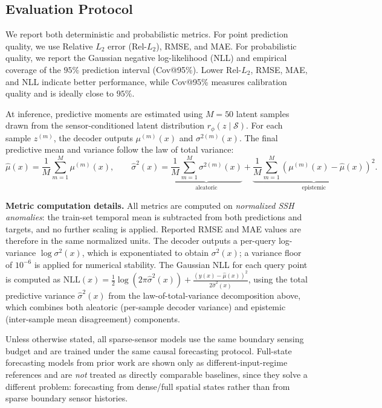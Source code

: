 \documentclass[11pt,a4paper]{article}
\begin{document}
\subsection{Evaluation Protocol}

We report both deterministic and probabilistic metrics. For point prediction quality, we use Relative $L_2$ error (Rel-$L_2$), RMSE, and MAE. For probabilistic quality, we report the Gaussian negative log-likelihood (NLL) and empirical coverage of the $95\%$ prediction interval (Cov@95\%). Lower Rel-$L_2$, RMSE, MAE, and NLL indicate better performance, while Cov@95\% measures calibration quality and is ideally close to $95\%$.

At inference, predictive moments are estimated using $M{=}50$ latent samples drawn from the sensor-conditioned latent distribution $r_\phi(z \mid \mathcal{S})$. For each sample $z^{(m)}$, the decoder outputs $\mu^{(m)}(x)$ and $\sigma^{2(m)}(x)$. The final predictive mean and variance follow the law of total variance:
\begin{equation}
\hat{\mu}(x) = \frac{1}{M}\sum_{m=1}^M \mu^{(m)}(x), \qquad
\hat{\sigma}^2(x) = \underbrace{\frac{1}{M}\sum_{m=1}^M \sigma^{2(m)}(x)}_{\text{aleatoric}} + \underbrace{\frac{1}{M}\sum_{m=1}^M \left(\mu^{(m)}(x) - \hat{\mu}(x)\right)^2}_{\text{epistemic}}.
\end{equation}

\textbf{Metric computation details.} All metrics are computed on \emph{normalized SSH anomalies}: the train-set temporal mean is subtracted from both predictions and targets, and no further scaling is applied. Reported RMSE and MAE values are therefore in the same normalized units. The decoder outputs a per-query log-variance $\log\sigma^2(x)$, which is exponentiated to obtain $\sigma^2(x)$; a variance floor of $10^{-6}$ is applied for numerical stability. The Gaussian NLL for each query point is computed as $\mathrm{NLL}(x) = \frac{1}{2}\log(2\pi\hat{\sigma}^2(x)) + \frac{(y(x) - \hat{\mu}(x))^2}{2\hat{\sigma}^2(x)}$, using the total predictive variance $\hat{\sigma}^2(x)$ from the law-of-total-variance decomposition above, which combines both aleatoric (per-sample decoder variance) and epistemic (inter-sample mean disagreement) components.

Unless otherwise stated, all sparse-sensor models use the same boundary sensing budget and are trained under the same causal forecasting protocol. Full-state forecasting models from prior work are shown only as different-input-regime references and are \emph{not} treated as directly comparable baselines, since they solve a different problem: forecasting from dense/full spatial states rather than from sparse boundary sensor histories.
\end{document}
